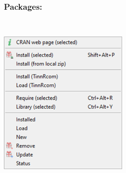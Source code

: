 \hypertarget{menu_r_control_packages}{}
\subsubsection{Packages:}\\

\includegraphics[scale=0.8]{./res/menu_r_control_packages.png}\\

